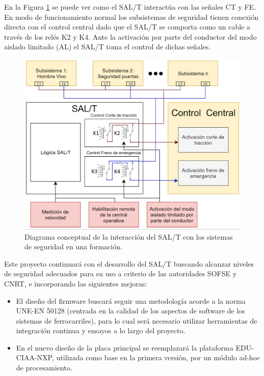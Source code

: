 \documentclass[11pt]{charter}
\begin{document}
\vspace{25px}

En la Figura \ref{fig:diagrama_de_bloques} se puede ver como el SAL/T interactúa con las señales CT y FE. 
En modo de funcionamiento normal los subsistemas de seguridad tienen conexión directa con el control central dado que el 
SAL/T se comporta como un cable a través de los relés K2 y K4. Ante la activación por parte del conductor del modo 
aislado limitado (AL) el SAL/T toma el control de dichas señales.

\vspace{15px}

\begin{figure}[htpb]
\centering 
\includegraphics[width=.95\textwidth]{./Figuras/diagrama_de_bloques.png}
\caption{Diagrama conceptual de la interacción del SAL/T con los sistemas de seguridad en una formación.}
\label{fig:diagrama_de_bloques}
\end{figure}

\vspace{15px}

Este proyecto continuará con el desarrollo del SAL/T buscando alcanzar niveles de seguridad adecuados para su uso a 
criterio de las autoridades SOFSE y CNRT, e incorporando las siguientes mejoras:

\begin{itemize}
\item El diseño del firmware buscará seguir una metodología acorde a la norma UNE-EN
50128 (centrada en la calidad de los aspectos de software de los sistemas de ferrocarriles), para lo cual será necesario
utilizar herramientas de integración continua y ensayos a lo largo del proyecto.
\item En el nuevo diseño de la placa principal se reemplazará la plataforma EDU-CIAA-NXP, utilizada como base en la primera 
versión, por un módulo ad-hoc de procesamiento.
\end{itemize}
\end{document}
